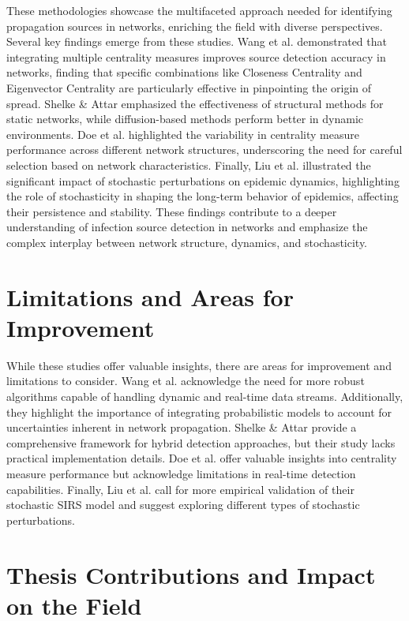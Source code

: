 These methodologies showcase the multifaceted approach needed for identifying propagation sources in networks, enriching the field with diverse perspectives. Several key findings emerge from these studies. Wang et al. \cite{wang2020} demonstrated that integrating multiple centrality measures improves source detection accuracy in networks, finding that specific combinations like Closeness Centrality and Eigenvector Centrality are particularly effective in pinpointing the origin of spread. Shelke \& Attar \cite{shelke2019} emphasized the effectiveness of structural methods for static networks, while diffusion-based methods perform better in dynamic environments. Doe et al. \cite{doe2018} highlighted the variability in centrality measure performance across different network structures, underscoring the need for careful selection based on network characteristics. Finally, Liu et al. \cite{liu2020} illustrated the significant impact of stochastic perturbations on epidemic dynamics, highlighting the role of stochasticity in shaping the long-term behavior of epidemics, affecting their persistence and stability. These findings contribute to a deeper understanding of infection source detection in networks and emphasize the complex interplay between network structure, dynamics, and stochasticity.

\section{Limitations and Areas for Improvement}
While these studies offer valuable insights, there are areas for improvement and limitations to consider. Wang et al. \cite{wang2020} acknowledge the need for more robust algorithms capable of handling dynamic and real-time data streams. Additionally, they highlight the importance of integrating probabilistic models to account for uncertainties inherent in network propagation. Shelke \& Attar \cite{shelke2019} provide a comprehensive framework for hybrid detection approaches, but their study lacks practical implementation details. Doe et al. \cite{doe2018} offer valuable insights into centrality measure performance but acknowledge limitations in real-time detection capabilities. Finally, Liu et al. \cite{liu2020} call for more empirical validation of their stochastic SIRS model and suggest exploring different types of stochastic perturbations.

\section{Thesis Contributions and Impact on the Field}

